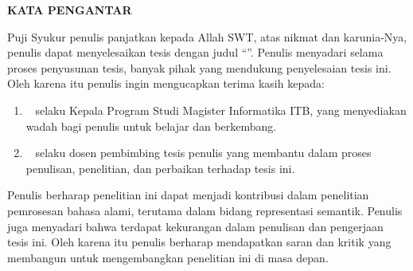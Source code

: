 \clearpage

\begin{center}
 \textbf{\large KATA PENGANTAR}\\[3em]
\end{center}

Puji Syukur penulis panjatkan kepada Allah SWT, atas nikmat dan karunia-Nya, penulis dapat menyelesaikan tesis dengan judul ``\textit{\Title}''. Penulis menyadari selama proses penyusunan tesis, banyak pihak yang mendukung penyelesaian tesis ini. Oleh karena itu penulis ingin mengucapkan terima kasih kepada:
\begin{enumerate}
  \item \DeanHonorific~\DeanName{} selaku Kepala Program Studi Magister Informatika ITB, yang menyediakan wadah bagi penulis untuk belajar dan berkembang.
  \item \SupervisorHonorific~\SupervisorName{} selaku dosen pembimbing tesis penulis yang membantu dalam proses penulisan, penelitian, dan perbaikan terhadap tesis ini.
\end{enumerate}

Penulis berharap penelitian ini dapat menjadi kontribusi dalam penelitian pemrosesan bahasa alami, terutama dalam bidang representasi semantik. Penulis juga menyadari bahwa terdapat kekurangan dalam penulisan dan pengerjaan tesis ini. Oleh karena itu penulis berharap mendapatkan saran dan kritik yang membangun untuk mengembangkan penelitian ini di masa depan.
